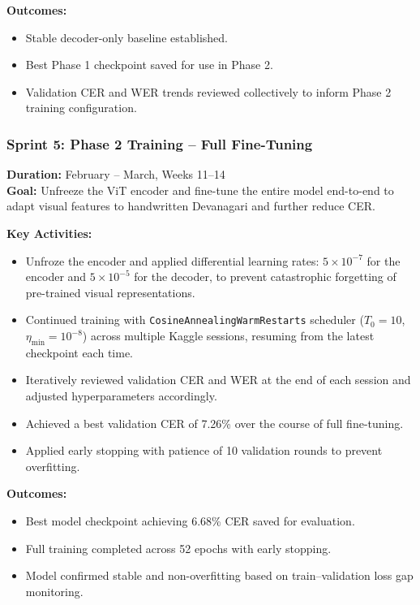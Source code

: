 \textbf{Outcomes:}
\begin{itemize}
    \item Stable decoder-only baseline established.
    \item Best Phase 1 checkpoint saved for use in Phase 2.
    \item Validation CER and WER trends reviewed collectively to 
    inform Phase 2 training configuration.
\end{itemize}

\subsubsection{Sprint 5: Phase 2 Training -- Full Fine-Tuning}
\textbf{Duration:} February -- March, Weeks 11--14\\
\textbf{Goal:} Unfreeze the ViT encoder and fine-tune the entire 
model end-to-end to adapt visual features to handwritten Devanagari 
and further reduce CER.

\textbf{Key Activities:}
\begin{itemize}
    \item Unfroze the encoder and applied differential learning 
    rates: $5 \times 10^{-7}$ for the encoder and $5 \times 
    10^{-5}$ for the decoder, to prevent catastrophic forgetting 
    of pre-trained visual representations.
    \item Continued training with \texttt{CosineAnnealingWarmRestarts} 
    scheduler ($T_0 = 10$, $\eta_{\min} = 10^{-8}$) across multiple 
    Kaggle sessions, resuming from the latest checkpoint each time.
    \item Iteratively reviewed validation CER and WER at the end of 
    each session and adjusted hyperparameters accordingly.
    \item Achieved a best validation CER of 7.26\% over the course 
    of full fine-tuning.
    \item Applied early stopping with patience of 10 validation 
    rounds to prevent overfitting.
\end{itemize}
\newpage
\textbf{Outcomes:}
\begin{itemize}
    \item Best model checkpoint achieving 6.68\% CER saved for 
    evaluation.
    \item Full training completed across 52 epochs with early 
    stopping.
    \item Model confirmed stable and non-overfitting based on 
    train--validation loss gap monitoring.
\end{itemize}

